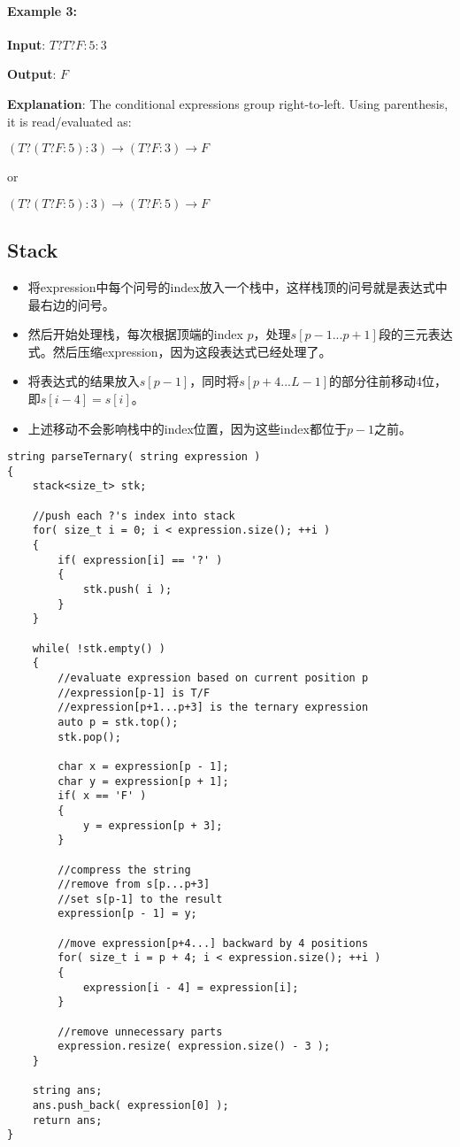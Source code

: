 \paragraph{Example 3:}

\begin{flushleft}
\textbf{Input}: $T?T?F:5:3$

\textbf{Output}: $F$

\textbf{Explanation}: The conditional expressions group right-to-left. Using parenthesis, it is read/evaluated as:

$(T ? (T ? F : 5) : 3) \longrightarrow (T ? F : 3) \longrightarrow F$

or

$(T ? (T ? F : 5) : 3) \longrightarrow (T ? F : 5) \longrightarrow F$
\end{flushleft}

\subsection{Stack}
\begin{itemize}
\item 将expression中每个问号的index放入一个栈中，这样栈顶的问号就是表达式中最右边的问号。
\item 然后开始处理栈，每次根据顶端的index $p$，处理$s[p-1...p+1]$段的三元表达式。然后压缩expression，因为这段表达式已经处理了。
\item 将表达式的结果放入$s[p-1]$，同时将$s[p+4...L-1]$的部分往前移动4位，即$s[i-4]=s[i]$。
\item 上述移动不会影响栈中的index位置，因为这些index都位于$p-1$之前。
\end{itemize}

\setcounter{lstlisting}{0}
\begin{lstlisting}[style=customc, caption={Stack}]
string parseTernary( string expression )
{
    stack<size_t> stk;

    //push each ?'s index into stack
    for( size_t i = 0; i < expression.size(); ++i )
    {
        if( expression[i] == '?' )
        {
            stk.push( i );
        }
    }

    while( !stk.empty() )
    {
        //evaluate expression based on current position p
        //expression[p-1] is T/F
        //expression[p+1...p+3] is the ternary expression
        auto p = stk.top();
        stk.pop();

        char x = expression[p - 1];
        char y = expression[p + 1];
        if( x == 'F' )
        {
            y = expression[p + 3];
        }

        //compress the string
        //remove from s[p...p+3]
        //set s[p-1] to the result
        expression[p - 1] = y;

        //move expression[p+4...] backward by 4 positions
        for( size_t i = p + 4; i < expression.size(); ++i )
        {
            expression[i - 4] = expression[i];
        }

        //remove unnecessary parts
        expression.resize( expression.size() - 3 );
    }

    string ans;
    ans.push_back( expression[0] );
    return ans;
}
\end{lstlisting}